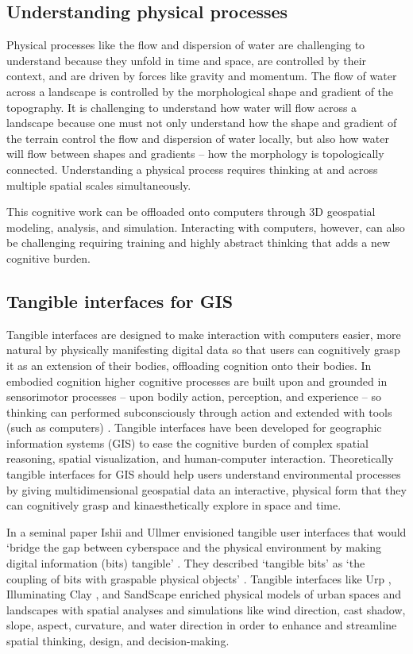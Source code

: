 \documentclass{isprs}
\begin{document}
\subsection{Understanding physical processes}
Physical processes like the flow and dispersion of water are challenging to understand because they unfold in time and space, are controlled by their context, and are driven by forces like gravity and momentum. The flow of water across a landscape is controlled by the morphological shape and gradient of the topography. It is challenging to understand how water will flow across a landscape because one must not only understand how the shape and gradient of the terrain control the flow and dispersion of water locally, but also how water will flow between shapes and gradients – how the morphology is topologically connected. Understanding a physical process requires thinking at and across multiple spatial scales simultaneously. 

This cognitive work can be offloaded onto computers through 3D geospatial modeling, analysis, and simulation. Interacting with computers, however, can also be challenging requiring training and highly abstract thinking that adds a new cognitive burden.

\subsection{Tangible interfaces for GIS}
%
Tangible interfaces are designed to make interaction with computers easier, more natural
by physically manifesting digital data so that users can cognitively grasp it as an extension of their bodies, offloading cognition onto their bodies. 
%
In embodied cognition higher cognitive processes are built upon and grounded in sensorimotor processes -- upon bodily action, perception, and experience -- 
so thinking can performed subconsciously through action and extended with tools (such as computers) \cite{Kirsh2013}.
%
Tangible interfaces have been developed for geographic information systems (GIS) to ease the cognitive burden of complex spatial reasoning, spatial visualization, and human-computer interaction. 
%
Theoretically tangible interfaces for GIS should help users understand environmental processes
by giving multidimensional geospatial data an interactive, physical form 
that they can cognitively grasp and kinaesthetically explore in space and time. 

In a seminal paper Ishii and Ullmer envisioned tangible user interfaces that would 
`bridge the gap between cyberspace and the physical environment by making digital information (bits) tangible' \cite{Ishii1997}.
They described `tangible bits' as `the coupling of bits with graspable physical objects' \cite{Ishii1997}. 
Tangible interfaces like 
Urp \cite{Underkoffler1999}, Illuminating Clay \cite{Piper2002}, and SandScape \cite{Ratti2004} 
enriched physical models of urban spaces and landscapes with spatial analyses and simulations 
like wind direction, cast shadow, slope, aspect, curvature, and water direction
in order to enhance and streamline spatial thinking, design, and decision-making.
\end{document}
